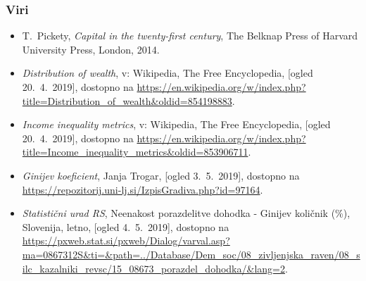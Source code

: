 \documentclass[10pt]{beamer}
\begin{document}
\begin{frame}
\frametitle{Viri}
	\begin{itemize}
		\item
			\label{Pickety}
			T.~Pickety, \emph{Capital in the twenty-first century}, The Belknap Press of 						Harvard University Press, London, 2014.

		\item 
			\label{Razdelitev premoženja}
			\emph{Distribution of wealth}, v: Wikipedia, The Free Encyclopedia, [ogled 							20.~4.~2019], dostopno na \url{https://en.wikipedia.org/w/index.php?								title=Distribution_of_wealth&oldid=854198883}.

		\item 
			\label{Metrike ekonomske neenakosti}
			\emph{Income inequality metrics}, v: Wikipedia, The Free Encyclopedia, [ogled 					20.~4.~2019], dostopno na \url{https://en.wikipedia.org/w/index.php?								title=Income_inequality_metrics&oldid=853906711}.

\item
\emph{Ginijev koeficient}, Janja Trogar, [ogled 3.~5.~2019], dostopno na \url{https://repozitorij.uni-lj.si/IzpisGradiva.php?id=97164}.

\item
\emph{Statistični urad RS}, Neenakost porazdelitve dohodka - Ginijev količnik (\%), Slovenija, letno, [ogled 4.~5.~2019], dostopno na \url{https://pxweb.stat.si/pxweb/Dialog/varval.asp?ma=0867312S&ti=&path=../Database/Dem_soc/08_zivljenjska_raven/08_silc_kazalniki_revsc/15_08673_porazdel_dohodka/&lang=2}.
\end{itemize}
\end {frame}
\end{document}
